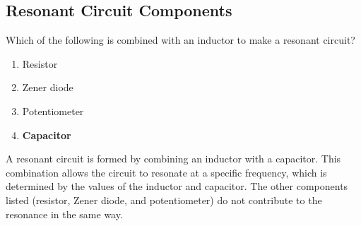 \subsection{Resonant Circuit Components}
\label{T6D08}

\begin{tcolorbox}[colback=gray!10!white,colframe=black!75!black,title=T6D08]
Which of the following is combined with an inductor to make a resonant circuit?
\begin{enumerate}[noitemsep]
    \item Resistor
    \item Zener diode
    \item Potentiometer
    \item \textbf{Capacitor}
\end{enumerate}
\end{tcolorbox}

A resonant circuit is formed by combining an inductor with a capacitor. This combination allows the circuit to resonate at a specific frequency, which is determined by the values of the inductor and capacitor. The other components listed (resistor, Zener diode, and potentiometer) do not contribute to the resonance in the same way.